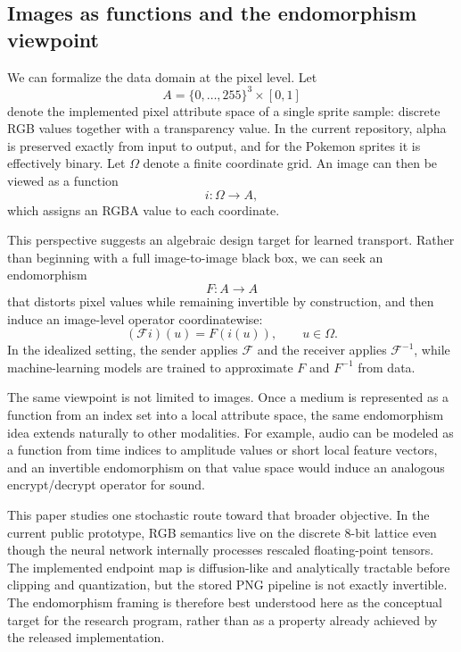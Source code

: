 \documentclass[11pt]{article}
\begin{document}
\subsection{Images as functions and the endomorphism viewpoint}
We can formalize the data domain at the pixel level. Let
\begin{equation}
A = \{0,\dots,255\}^3 \times [0,1]
\end{equation}
denote the implemented pixel attribute space of a single sprite sample: discrete RGB values together with a transparency value. In the current repository, alpha is preserved exactly from input to output, and for the Pokemon sprites it is effectively binary. Let $\Omega$ denote a finite coordinate grid. An image can then be viewed as a function
\begin{equation}
i : \Omega \to A,
\end{equation}
which assigns an RGBA value to each coordinate.

This perspective suggests an algebraic design target for learned transport. Rather than beginning with a full image-to-image black box, we can seek an endomorphism
\begin{equation}
F : A \to A
\end{equation}
that distorts pixel values while remaining invertible by construction, and then induce an image-level operator coordinatewise:
\begin{equation}
(\mathcal{F}i)(u) = F(i(u)), \qquad u \in \Omega.
\end{equation}
In the idealized setting, the sender applies $\mathcal{F}$ and the receiver applies $\mathcal{F}^{-1}$, while machine-learning models are trained to approximate $F$ and $F^{-1}$ from data.

The same viewpoint is not limited to images. Once a medium is represented as a function from an index set into a local attribute space, the same endomorphism idea extends naturally to other modalities. For example, audio can be modeled as a function from time indices to amplitude values or short local feature vectors, and an invertible endomorphism on that value space would induce an analogous encrypt/decrypt operator for sound.

This paper studies one stochastic route toward that broader objective. In the current public prototype, RGB semantics live on the discrete $8$-bit lattice even though the neural network internally processes rescaled floating-point tensors. The implemented endpoint map is diffusion-like and analytically tractable before clipping and quantization, but the stored PNG pipeline is not exactly invertible. The endomorphism framing is therefore best understood here as the conceptual target for the research program, rather than as a property already achieved by the released implementation.
\end{document}
